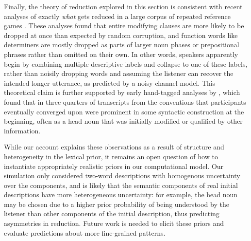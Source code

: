 Finally, the theory of reduction explored in this section is consistent with recent analyses of exactly \emph{what} gets reduced in a large corpus of repeated reference games \cite{hawkins2020characterizing}.
These analyses found that entire modifying clauses are more likely to be dropped at once than expected by random corruption, and function words like determiners are mostly dropped as parts of larger noun phases or prepositional phrases rather than omitted on their own.
In other words, speakers apparently begin by combining multiple descriptive labels and collapse to one of these labels, rather than noisily dropping words and assuming the listener can recover the intended longer utterance, as predicted by a noisy channel model.
This theoretical claim is further supported by early hand-tagged analyses by , which found that in three-quarters of transcripts from  the conventions that participants eventually converged upon were prominent in some syntactic construction at the beginning, often as a head noun that was initially modified or qualified by other information. 

While our account explains these observations as a result of structure and heterogeneity in the lexical prior, it remains an open question of how to instantiate appropriately realistic priors in our computational model. 
Our simulation only considered two-word descriptions with homogenous uncertainty over the components, and is likely that the semantic components of real initial descriptions have more heterogeneous uncertainty: for example, the head noun may be chosen due to a higher prior probability of being understood by the listener than other components of the initial description, thus predicting asymmetries in reduction. 
Future work is needed to elicit these priors and evaluate predictions about more fine-grained patterns.






